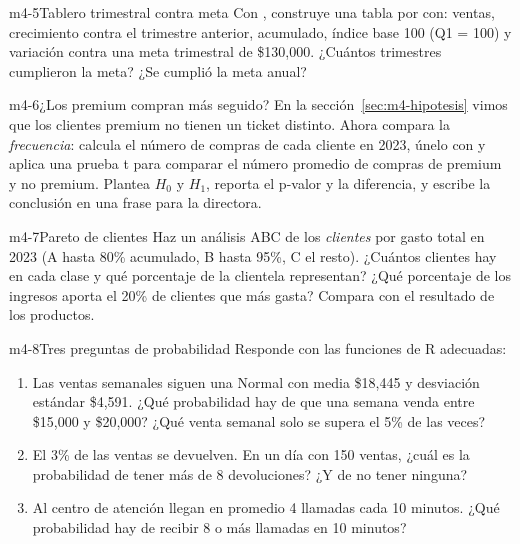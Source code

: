 \begin{ejercicio}{m4-5}{Tablero trimestral contra meta}
Con , construye una tabla por
 con: ventas, crecimiento contra el trimestre anterior,
acumulado, índice base 100 (Q1 = 100) y variación contra una meta
trimestral de \$130,000. ¿Cuántos trimestres cumplieron la meta? ¿Se cumplió
la meta anual?
\end{ejercicio}

\begin{ejercicio}{m4-6}{¿Los premium compran más seguido?}
En la sección~\ref{sec:m4-hipotesis} vimos que los clientes premium no
tienen un ticket distinto. Ahora compara la \emph{frecuencia}: calcula el
número de compras de cada cliente en 2023, únelo con
 y aplica una prueba t para comparar el número
promedio de compras de premium y no premium. Plantea $H_0$ y $H_1$, reporta
el p-valor y la diferencia, y escribe la conclusión en una frase para la
directora.
\end{ejercicio}

\begin{ejercicio}{m4-7}{Pareto de clientes}
Haz un análisis ABC de los \emph{clientes} por gasto total en 2023 (A hasta
80\% acumulado, B hasta 95\%, C el resto). ¿Cuántos clientes hay en cada
clase y qué porcentaje de la clientela representan? ¿Qué porcentaje de los
ingresos aporta el 20\% de clientes que más gasta? Compara con el resultado
de los productos.
\end{ejercicio}

\begin{ejercicio}{m4-8}{Tres preguntas de probabilidad}
Responde con las funciones de R adecuadas:
\begin{enumerate}
  \item Las ventas semanales siguen una Normal con media \$18,445 y
        desviación estándar \$4,591. ¿Qué probabilidad hay de que una semana
        venda entre \$15,000 y \$20,000? ¿Qué venta semanal solo se supera
        el 5\% de las veces?
  \item El 3\% de las ventas se devuelven. En un día con 150 ventas, ¿cuál
        es la probabilidad de tener más de 8 devoluciones? ¿Y de no tener
        ninguna?
  \item Al centro de atención llegan en promedio 4 llamadas cada 10
        minutos. ¿Qué probabilidad hay de recibir 8 o más llamadas en 10
        minutos?
\end{enumerate}
\end{ejercicio}

